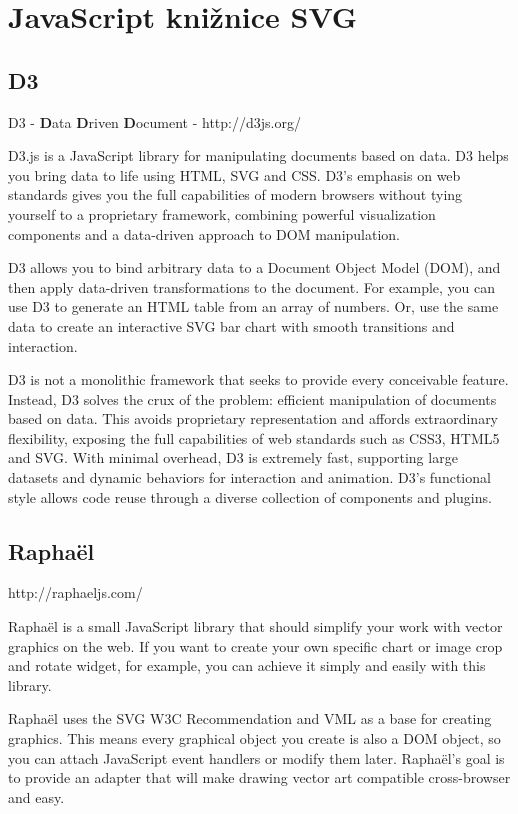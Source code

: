 \section{JavaScript knižnice SVG}

\subsection{D3}
D3  - \textbf{D}ata \textbf{D}riven \textbf{D}ocument -  http://d3js.org/

D3.js is a JavaScript library for manipulating documents based on data. D3 helps you bring data to life using HTML, SVG and CSS. D3’s emphasis on web standards gives you the full capabilities of modern browsers without tying yourself to a proprietary framework, combining powerful visualization components and a data-driven approach to DOM manipulation. 

D3 allows you to bind arbitrary data to a Document Object Model (DOM), and then apply data-driven transformations to the document. For example, you can use D3 to generate an HTML table from an array of numbers. Or, use the same data to create an interactive SVG bar chart with smooth transitions and interaction.

D3 is not a monolithic framework that seeks to provide every conceivable feature. Instead, D3 solves the crux of the problem: efficient manipulation of documents based on data. This avoids proprietary representation and affords extraordinary flexibility, exposing the full capabilities of web standards such as CSS3, HTML5 and SVG. With minimal overhead, D3 is extremely fast, supporting large datasets and dynamic behaviors for interaction and animation. D3’s functional style allows code reuse through a diverse collection of components and plugins. 

\subsection{Raphaël}
http://raphaeljs.com/

 Raphaël is a small JavaScript library that should simplify your work with vector graphics on the web. If you want to create your own specific chart or image crop and rotate widget, for example, you can achieve it simply and easily with this library.

Raphaël  uses the SVG W3C Recommendation and VML as a base for creating graphics. This means every graphical object you create is also a DOM object, so you can attach JavaScript event handlers or modify them later. Raphaël’s goal is to provide an adapter that will make drawing vector art compatible cross-browser and easy.

